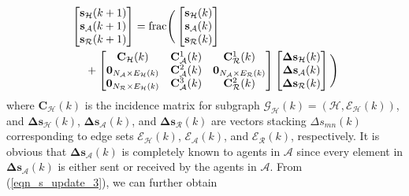 \documentclass{IEEEtran}
\begin{document}
\begin{equation}\label{eqn_s_update_3}
	\begin{aligned}
		& \begin{bmatrix}
			\mathbf{s}_{\mathcal{H}}(k+1)\\
			\mathbf{s}_{\mathcal{A}}(k+1)\\
			\mathbf{s}_{\mathcal{R}}(k+1)
		\end{bmatrix}
		={\rm frac}\Bigg(
		\begin{bmatrix}
			\mathbf{s}_{\mathcal{H}}(k)\\
			\mathbf{s}_{\mathcal{A}}(k)\\
			\mathbf{s}_{\mathcal{R}}(k)
		\end{bmatrix} \\
		& \quad \ +
		\begin{bmatrix}
			\mathbf{C}_{\mathcal{H}}(k) & \mathbf{C}_{\mathcal{A}}^1(k) & \mathbf{C}_{\mathcal{R}}^1(k) \\
			\mathbf{0}_{N_{\mathcal{A}} \times E_{\mathcal{H}}(k)} & \mathbf{C}_{\mathcal{A}}^2(k) & \mathbf{0}_{N_{\mathcal{A}} \times E_{\mathcal{R}}(k)} \\
			\mathbf{0}_{N_{\mathcal{R}} \times E_{\mathcal{H}}(k)} & \mathbf{C}_{\mathcal{A}}^3(k) & \mathbf{C}_{\mathcal{R}}^2(k) \\
		\end{bmatrix}
		\begin{bmatrix}
			\boldsymbol{\Delta}\mathbf{s}_{\mathcal{H}}(k)\\
			\boldsymbol{\Delta}\mathbf{s}_{\mathcal{A}}(k)\\
			\boldsymbol{\Delta}\mathbf{s}_{\mathcal{R}}(k)
		\end{bmatrix}
		\Bigg)
	\end{aligned}
\end{equation}
where $\mathbf{C}_{\mathcal{H}}(k)$ is the incidence matrix for subgraph $\mathcal{G_H}(k)=(\mathcal{H},\mathcal{E_H}(k))$, and $\boldsymbol{\Delta}\mathbf{s}_{\mathcal{H}}(k)$, $\boldsymbol{\Delta}\mathbf{s}_{\mathcal{A}}(k)$, and $\boldsymbol{\Delta}\mathbf{s}_{\mathcal{R}}(k)$ are vectors stacking $\Delta s_{mn}(k)$ corresponding to edge sets $\mathcal{E_H}(k)$, $\mathcal{E_A}(k)$, and $\mathcal{E_R}(k)$, respectively. It is obvious that $\boldsymbol{\Delta}\mathbf{s}_{\mathcal{A}}(k)$ is completely known to agents in $\mathcal{A}$ since every element in $\boldsymbol{\Delta}\mathbf{s}_{\mathcal{A}}(k)$ is either sent or received by the agents in $\mathcal{A}$. From (\ref{eqn_s_update_3}), we can further obtain
\end{document}
